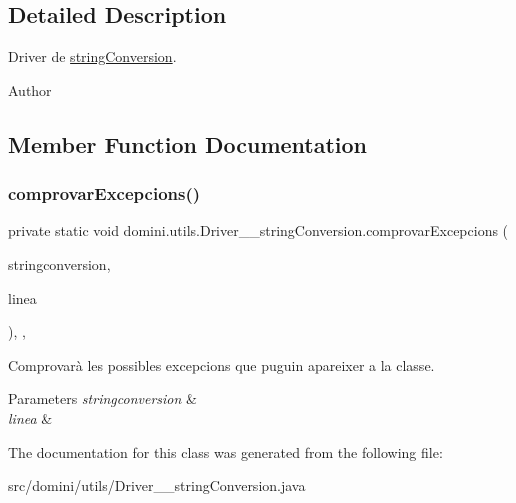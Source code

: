 \subsection{Detailed Description}
Driver de \hyperlink{classdomini_1_1utils_1_1stringConversion}{string\+Conversion}. 

\begin{DoxyAuthor}{Author}

\end{DoxyAuthor}


\subsection{Member Function Documentation}
\mbox{\label{classdomini_1_1utils_1_1Driver____stringConversion_a024c991699ce1aac984d31cd210396e3}} 
\subsubsection{\texorpdfstring{comprovar\+Excepcions()}{comprovarExcepcions()}}
{\footnotesize\ttfamily private static void domini.\+utils.\+Driver\+\_\+\+\_\+string\+Conversion.\+comprovar\+Excepcions (\begin{DoxyParamCaption}\item[{\hyperlink{classdomini_1_1utils_1_1stringConversion}{string\+Conversion}}]{stringconversion,  }\item[{String}]{linea }\end{DoxyParamCaption})\hspace{0.3cm}{\ttfamily [inline]}, {\ttfamily [static]}, {\ttfamily [private]}}



Comprovarà les possibles excepcions que puguin apareixer a la classe. 


\begin{DoxyParams}{Parameters}
{\em stringconversion} & \\
\hline
{\em linea} & \\
\hline
\end{DoxyParams}


The documentation for this class was generated from the following file\+:\begin{DoxyCompactItemize}
\item 
src/domini/utils/Driver\+\_\+\+\_\+string\+Conversion.\+java\end{DoxyCompactItemize}
